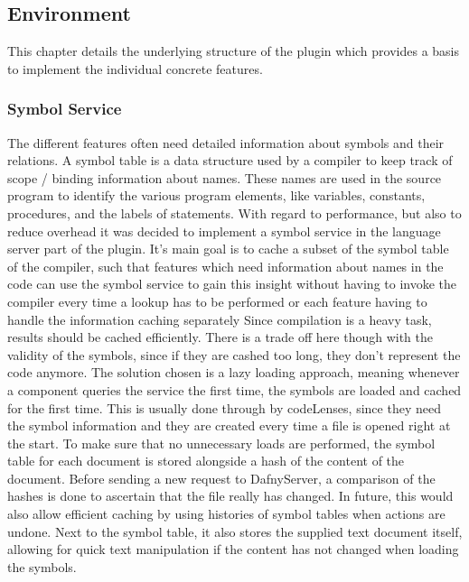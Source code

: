 \subsection{Environment}\label{environment}
This chapter details the underlying structure of the plugin which provides a basis to implement the individual concrete features.

\subsubsection{Symbol Service}\label{symbolservice}
The different features often need detailed information about symbols and their relations. A symbol table is a data structure used by a compiler to keep track of scope / binding information about names. These names are used in the source program to identify the various program elements, like variables, constants, procedures, and the labels of statements.\cite[239]{compiler} \newline
With regard to performance, but also to reduce overhead it was decided to implement a symbol service in the language server part of the plugin. It's main goal is to cache a subset of the symbol table of the compiler, such that features which need information about names in the code can use the symbol service to gain this insight without having to invoke the compiler every time a lookup has to be performed or each feature having to handle the information caching separately \newline
Since compilation is a heavy task, results should be cached efficiently. There is a trade off here though with the validity of the symbols, since if they are cashed too long, they don't represent the code anymore. The solution chosen is a lazy loading approach, meaning whenever a component queries the service the first time, the symbols are loaded and cached for the first time. This is usually done through by codeLenses, since they need the symbol information and they are created every time a file is opened right at the start. To make sure that no unnecessary loads are performed, the symbol table for each document is stored alongside a hash of the content of the document. Before sending a new request to DafnyServer, a comparison of the hashes is done to ascertain that the file really has changed. In future, this would also allow efficient caching by using histories of symbol tables when actions are undone. Next to the symbol table, it also stores the supplied text document itself, allowing for quick text manipulation if the content has not changed when loading the symbols.\newline
